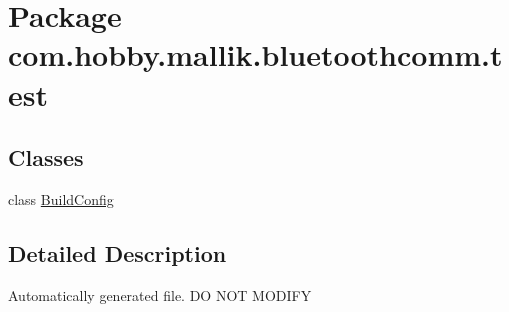 \hypertarget{namespacecom_1_1hobby_1_1mallik_1_1bluetoothcomm_1_1test}{}\section{Package com.\+hobby.\+mallik.\+bluetoothcomm.\+test}
\label{namespacecom_1_1hobby_1_1mallik_1_1bluetoothcomm_1_1test}
\subsection*{Classes}
\begin{DoxyCompactItemize}
\item 
class \hyperlink{classcom_1_1hobby_1_1mallik_1_1bluetoothcomm_1_1test_1_1_build_config}{Build\+Config}
\end{DoxyCompactItemize}


\subsection{Detailed Description}
Automatically generated file. DO N\+OT M\+O\+D\+I\+FY 